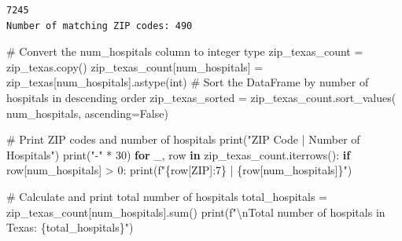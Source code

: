 \documentclass[
  letterpaper,
  DIV=11,
  numbers=noendperiod]{scrartcl}
\newenvironment{Shaded}{\begin{snugshade}}{\end{snugshade}}
\newcommand{\BuiltInTok}[1]{\textcolor[rgb]{0.00,0.23,0.31}{#1}}
\newcommand{\CharTok}[1]{\textcolor[rgb]{0.13,0.47,0.30}{#1}}
\newcommand{\CommentTok}[1]{\textcolor[rgb]{0.37,0.37,0.37}{#1}}
\newcommand{\ControlFlowTok}[1]{\textcolor[rgb]{0.00,0.23,0.31}{\textbf{#1}}}
\newcommand{\DecValTok}[1]{\textcolor[rgb]{0.68,0.00,0.00}{#1}}
\newcommand{\KeywordTok}[1]{\textcolor[rgb]{0.00,0.23,0.31}{\textbf{#1}}}
\newcommand{\NormalTok}[1]{\textcolor[rgb]{0.00,0.23,0.31}{#1}}
\newcommand{\OperatorTok}[1]{\textcolor[rgb]{0.37,0.37,0.37}{#1}}
\newcommand{\SpecialCharTok}[1]{\textcolor[rgb]{0.37,0.37,0.37}{#1}}
\newcommand{\SpecialStringTok}[1]{\textcolor[rgb]{0.13,0.47,0.30}{#1}}
\newcommand{\StringTok}[1]{\textcolor[rgb]{0.13,0.47,0.30}{#1}}
\newcommand{\VariableTok}[1]{\textcolor[rgb]{0.07,0.07,0.07}{#1}}
\begin{document}
\begin{verbatim}
7245
Number of matching ZIP codes: 490
\end{verbatim}

\begin{Shaded}
\begin{Highlighting}[]
\CommentTok{\# Convert the \textquotesingle{}num\_hospitals\textquotesingle{} column to integer type}
\NormalTok{zip\_texas\_count }\OperatorTok{=}\NormalTok{ zip\_texas.copy()}
\NormalTok{zip\_texas\_count[}\StringTok{\textquotesingle{}num\_hospitals\textquotesingle{}}\NormalTok{] }\OperatorTok{=}\NormalTok{ zip\_texas[}\StringTok{\textquotesingle{}num\_hospitals\textquotesingle{}}\NormalTok{].astype(}\BuiltInTok{int}\NormalTok{)}
\CommentTok{\# Sort the DataFrame by number of hospitals in descending order}
\NormalTok{zip\_texas\_sorted }\OperatorTok{=}\NormalTok{ zip\_texas\_count.sort\_values(}
    \StringTok{\textquotesingle{}num\_hospitals\textquotesingle{}}\NormalTok{, ascending}\OperatorTok{=}\VariableTok{False}\NormalTok{)}

\CommentTok{\# Print ZIP codes and number of hospitals}
\BuiltInTok{print}\NormalTok{(}\StringTok{"ZIP Code | Number of Hospitals"}\NormalTok{)}
\BuiltInTok{print}\NormalTok{(}\StringTok{"{-}"} \OperatorTok{*} \DecValTok{30}\NormalTok{)}
\ControlFlowTok{for}\NormalTok{ \_, row }\KeywordTok{in}\NormalTok{ zip\_texas\_count.iterrows():}
    \ControlFlowTok{if}\NormalTok{ row[}\StringTok{\textquotesingle{}num\_hospitals\textquotesingle{}}\NormalTok{] }\OperatorTok{\textgreater{}} \DecValTok{0}\NormalTok{:}
        \BuiltInTok{print}\NormalTok{(}\SpecialStringTok{f"}\SpecialCharTok{\{}\NormalTok{row[}\StringTok{\textquotesingle{}ZIP\textquotesingle{}}\NormalTok{]}\SpecialCharTok{:7\}}\SpecialStringTok{ | }\SpecialCharTok{\{}\NormalTok{row[}\StringTok{\textquotesingle{}num\_hospitals\textquotesingle{}}\NormalTok{]}\SpecialCharTok{\}}\SpecialStringTok{"}\NormalTok{)}

\CommentTok{\# Calculate and print total number of hospitals}
\NormalTok{total\_hospitals }\OperatorTok{=}\NormalTok{ zip\_texas\_count[}\StringTok{\textquotesingle{}num\_hospitals\textquotesingle{}}\NormalTok{].}\BuiltInTok{sum}\NormalTok{()}
\BuiltInTok{print}\NormalTok{(}\SpecialStringTok{f"}\CharTok{\textbackslash{}n}\SpecialStringTok{Total number of hospitals in Texas: }\SpecialCharTok{\{}\NormalTok{total\_hospitals}\SpecialCharTok{\}}\SpecialStringTok{"}\NormalTok{)}
\end{Highlighting}
\end{Shaded}
\end{document}
